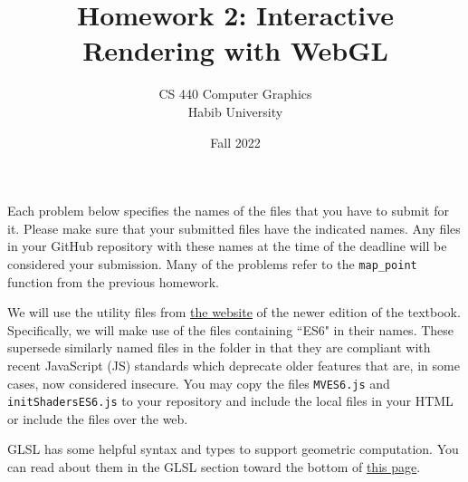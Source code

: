 \documentclass[addpoints]{exam}
\title{Homework 2: Interactive Rendering with WebGL}
\author{CS 440 Computer Graphics\\Habib University}
\date{Fall 2022}
\begin{document}
\maketitle

Each problem below specifies the names of the files that you have to submit for it. Please make sure that your submitted files have the indicated names. Any files in your GitHub repository with these names at the time of the deadline will be considered your submission. Many of the problems refer to the {\tt map\_point} function from the previous homework.

We will use the utility files from \href{https://bit.ly/3Bqt8XG}{the website} of the newer edition of the textbook. Specifically, we will make use of the files containing ``ES6" in their names. These supersede similarly named files in the folder in that they are compliant with recent JavaScript (JS) standards which deprecate older features that are, in some cases, now considered insecure. You may copy the files \texttt{MVES6.js} and \texttt{initShadersES6.js} to your repository and include the local files in your HTML or include the files over the web.

GLSL has some helpful syntax and types to support geometric computation. You can read about them in the GLSL section toward the bottom of \href{https://webgl2fundamentals.org/webgl/lessons/webgl-shaders-and-glsl.html}{this page}.
\end{document}
